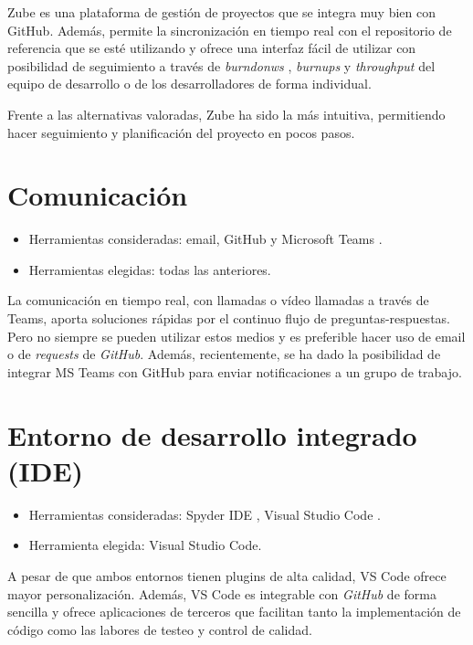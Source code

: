 Zube es una plataforma de gestión de proyectos que se integra muy bien con GitHub. Además,
permite la sincronización en tiempo real con el repositorio de referencia que se esté 
utilizando y ofrece una interfaz fácil de utilizar con posibilidad de seguimiento
a través de \emph{burndonws} , \emph{burnups} y \emph{throughput} del equipo de desarrollo 
o de los desarrolladores de forma individual. 

Frente a las alternativas valoradas, Zube ha sido la más intuitiva,
permitiendo hacer seguimiento y planificación del proyecto en pocos pasos. 


\section{Comunicación}\label{comunicacion}

\begin{itemize}
\tightlist
\item
  Herramientas consideradas: email, GitHub y Microsoft Teams \citep{online:ms_teams}.
\item
  Herramientas elegidas: todas las anteriores. 
\end{itemize}

La comunicación en tiempo real, con llamadas o vídeo llamadas a través de Teams, 
 aporta soluciones rápidas por el continuo flujo de preguntas-respuestas. Pero no 
 siempre se pueden utilizar estos medios y es preferible hacer uso de email 
 o de \emph{requests} de \emph{GitHub}. Además, recientemente, se ha dado la posibilidad
 de integrar MS Teams con GitHub \citep{online:integrar_teams_github} para enviar notificaciones 
 a un grupo de trabajo. 


\section{Entorno de desarrollo integrado (IDE)}\label{ide}

\begin{itemize}
\tightlist
\item
  Herramientas consideradas: Spyder IDE \citep{online:spyder}, Visual Studio Code \citep{online:vs_code}.
\item
  Herramienta elegida: Visual Studio Code. 
\end{itemize}

A pesar de que ambos entornos tienen plugins de alta calidad, VS Code ofrece mayor 
personalización. Además, VS Code es integrable con \emph{GitHub} de forma sencilla y
ofrece aplicaciones de terceros que facilitan tanto la implementación de código como
las labores de testeo y control de calidad. 

